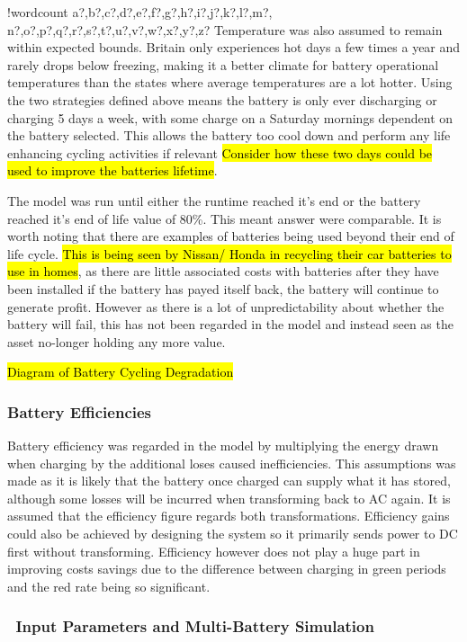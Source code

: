 \documentclass[fontsize=9.5pt]{extarticle}
\numberwithin{figure}{section} %
\newcounter{words}
\newenvironment{counted}{%
  \setcounter{words}{0}
  \SearchList!{wordcount}{\stepcounter{words}}
    {a?,b?,c?,d?,e?,f?,g?,h?,i?,j?,k?,l?,m?,
    n?,o?,p?,q?,r?,s?,t?,u?,v?,w?,x?,y?,z?}
  \UndoBoundary{'}
  \SearchOrder{p;}}{%
  \StopSearching}
\begin{document}
\begin{counted}
Temperature was also assumed to remain within expected bounds. Britain
only experiences hot days a few times a year and rarely drops below
freezing, making it a better climate for battery operational
temperatures than the states where average temperatures are a lot
hotter. Using the two strategies defined above means the battery is only
ever discharging or charging 5 days a week, with some charge on a
Saturday mornings dependent on the battery selected. This allows the
battery too cool down and perform any life enhancing cycling activities
if relevant
\hl{Consider how these two days could be used to improve the batteries lifetime}.

The model was run until either the runtime reached it's end or the
battery reached it's end of life value of 80\%. This meant answer were
comparable. It is worth noting that there are examples of batteries
being used beyond their end of life cycle.
\hl{This is being seen by Nissan/ Honda in recycling their car batteries to use in homes},
as there are little associated costs with batteries after they have been
installed if the battery has payed itself back, the battery will
continue to generate profit. However as there is a lot of
unpredictability about whether the battery will fail, this has not been
regarded in the model and instead seen as the asset no-longer holding
any more value.

\hl{Diagram of Battery Cycling Degradation}

\subsubsection{Battery Efficiencies}\label{battery-efficiencies}

Battery efficiency was regarded in the model by multiplying the energy
drawn when charging by the additional loses caused inefficiencies. This
assumptions was made as it is likely that the battery once charged can
supply what it has stored, although some losses will be incurred when
transforming back to AC again. It is assumed that the efficiency figure
regards both transformations. Efficiency gains could also be achieved by
designing the system so it primarily sends power to DC first without
transforming. Efficiency however does not play a huge part in improving
costs savings due to the difference between charging in green periods
and the red rate being so significant.

\subsubsection{~Input Parameters and Multi-Battery
Simulation}\label{input-parameters-and-multi-battery-simulation}


\end{counted}
\end{document}
